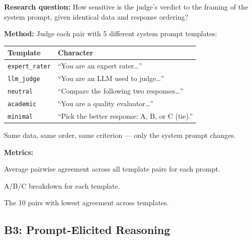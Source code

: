 \documentclass[11pt,a4paper]{article}
\begin{document}
\begin{experimentbox}
\textbf{Research question:} How sensitive is the judge's verdict to the
framing of the system prompt, given identical data and response ordering?

\medskip
\textbf{Method:} Judge each pair with 5 different system prompt templates:

\begin{center}
\small
\begin{tabular}{ll}
  \toprule
  \textbf{Template} & \textbf{Character} \\
  \midrule
  \texttt{expert\_rater} & ``You are an expert rater\ldots'' \\
  \texttt{llm\_judge}    & ``You are an LLM used to judge\ldots'' \\
  \texttt{neutral}       & ``Compare the following two responses\ldots'' \\
  \texttt{academic}      & ``You are a quality evaluator\ldots'' \\
  \texttt{minimal}       & ``Pick the better response: A, B, or C (tie).'' \\
  \bottomrule
\end{tabular}
\end{center}

Same data, same order, same criterion --- only the system prompt changes.

\medskip
\textbf{Metrics:}
\begin{description}[nosep, leftmargin=1.2cm]
  \item[\texttt{overall\_pairwise\_agreement}] Average pairwise agreement
    across all template pairs for each prompt.
  \item[\texttt{label\_distribution\_per\_condition}] A/B/C breakdown for
    each template.
  \item[\texttt{most\_volatile\_pairs}] The 10 pairs with lowest agreement
    across templates.
\end{description}
\end{experimentbox}


\subsection{B3: Prompt-Elicited Reasoning}\label{sec:b3}
\end{document}
